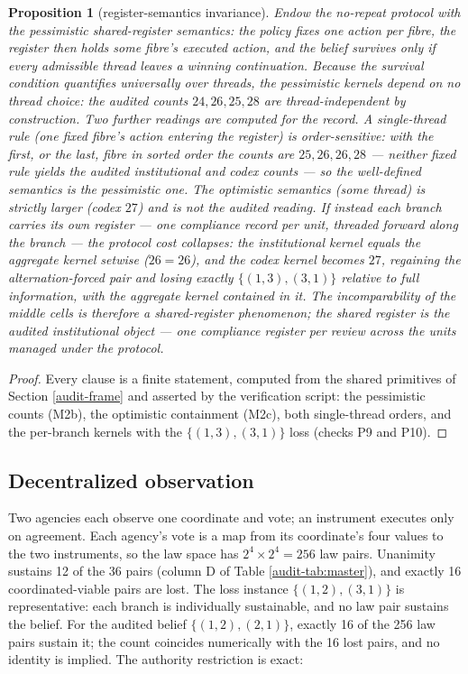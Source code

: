 \documentclass[10pt,twocolumn]{article}
\theoremstyle{plain}
\newtheorem{proposition}[theorem]{Proposition}
\theoremstyle{definition}
\theoremstyle{remark}
\begin{document}
\begin{proposition}[register-semantics invariance]\label{audit-prop:register}
Endow the no-repeat protocol with the pessimistic shared-register
semantics: the policy fixes one action per fibre, the register then holds
some fibre's executed action, and the belief survives only if every
admissible thread leaves a winning continuation. Because the survival condition
quantifies universally over threads, the
pessimistic kernels depend on no thread choice: the audited counts
\(24, 26, 25, 28\) are thread-independent by construction. Two further
readings are computed for the record. A single-thread rule (one fixed
fibre's action entering the register) is order-sensitive: with the
first, or the last, fibre in sorted order the counts are
\(25, 26, 26, 28\) --- neither fixed rule yields the audited
institutional and codex counts --- so the well-defined semantics is the
pessimistic one. The optimistic semantics (some thread) is strictly
larger (codex \(27\)) and is not the audited reading. If instead each
branch carries its own register --- one compliance record per unit,
threaded forward along the branch --- the protocol cost collapses: the
institutional kernel equals the aggregate kernel setwise (\(26 = 26\)),
and the codex kernel becomes \(27\), regaining the alternation-forced
pair and losing exactly \(\{(1,3),(3,1)\}\) relative to full
information, with the aggregate kernel contained in it. The
incomparability of the middle cells is therefore a shared-register
phenomenon; the shared register is the audited institutional object ---
one compliance register per review across the units managed under the
protocol.
\end{proposition}

\begin{proof}
Every clause is a finite statement, computed from the shared primitives
of Section \ref{audit-frame} and asserted by the verification script: the
pessimistic counts (M2b), the optimistic containment (M2c), both
single-thread orders, and the per-branch kernels with the
\(\{(1,3),(3,1)\}\) loss (checks P9 and P10).
\end{proof}

\subsection{Decentralized observation}\label{audit-decentralized}

Two agencies each observe one coordinate and vote; an instrument
executes only on agreement. Each agency's vote is a map from its
coordinate's four values to the two instruments, so the law space has
\(2^{4} \times 2^{4} = 256\) law pairs. Unanimity sustains 12 of the
36 pairs (column D of Table \ref{audit-tab:master}), and exactly 16
coordinated-viable pairs are lost. The loss instance
\(\{(1,2),(3,1)\}\) is representative: each branch is individually
sustainable, and no law pair sustains the belief. For the audited belief
\(\{(1,2),(2,1)\}\), exactly 16 of the 256 law pairs sustain it; the
count coincides numerically with the 16 lost pairs, and no identity is
implied. The authority restriction is exact:
\end{document}
